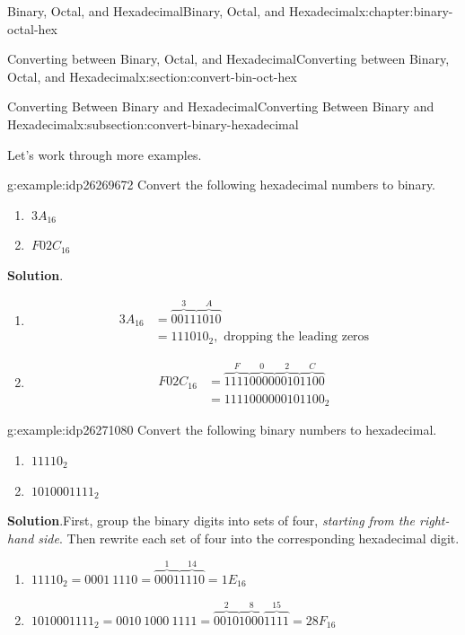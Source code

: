\documentclass[twoside,10pt,]{book}
\newcommand{\blocktitlefont}{\relax}
\numberwithin{equation}{section}
\newcommand{\amp}{&}
\begin{document}
\begin{chapterptx}{Binary, Octal, and Hexadecimal}{}{Binary, Octal, and Hexadecimal}{}{}{x:chapter:binary-octal-hex}
\begin{sectionptx}{Converting between Binary, Octal, and Hexadecimal}{}{Converting between Binary, Octal, and Hexadecimal}{}{}{x:section:convert-bin-oct-hex}
\begin{subsectionptx}{Converting Between Binary and Hexadecimal}{}{Converting Between Binary and Hexadecimal}{}{}{x:subsection:convert-binary-hexadecimal}
%
\par
Let's work through more examples.%
\begin{example}{}{g:example:idp26269672}%
Convert the following hexadecimal numbers to binary. %
%
\begin{enumerate}
\item{}\(\displaystyle \ 3A_{16}\)%
\item{}\(\displaystyle \ F02C_{16}\)%
\end{enumerate}
\par\smallskip%
\noindent\textbf{\blocktitlefont Solution}.\label{g:solution:idp26273384}{}\hypertarget{g:solution:idp26273384}{}\quad{}%
\begin{enumerate}
\item{}%
\begin{align*}
3A_{16} \amp = \overbrace{0011}^3\overbrace{1010}^A\\
\amp = 111010_2,\text{ dropping the leading zeros}
\end{align*}
%
\item{}%
\begin{align*}
F02C_{16} \amp = \overbrace{1111}^F\overbrace{0000}^0\overbrace{0010}^2\overbrace{1100}^C\\
\amp = 1111000000101100_2
\end{align*}
%
\end{enumerate}
\end{example}
\begin{example}{}{g:example:idp26271080}%
Convert the following binary numbers to hexadecimal. %
\begin{enumerate}
\item{}\(\displaystyle \ 11110_2\)%
\item{}\(\displaystyle \ 1010001111_2\)%
\end{enumerate}
\par\smallskip%
\noindent\textbf{\blocktitlefont Solution}.\label{g:solution:idp26276968}{}\hypertarget{g:solution:idp26276968}{}\quad{}First, group the binary digits into sets of four, \emph{starting from the right-hand side}.  Then rewrite each set of four into the corresponding hexadecimal digit. %
\begin{enumerate}
\item{}\(\displaystyle \ 11110_2 = 0001\ 1110 = \overbrace{0001}^1\overbrace{1110}^{14}=1E_{16}\)%
\item{}\(\displaystyle \ 1010001111_2 = 0010\ 1000\ 1111=\overbrace{0010}^2\overbrace{1000}^8\overbrace{1111}^{15}=28F_{16}\)%

\end{enumerate}
\end{example}
\end{subsectionptx}
\end{sectionptx}
\end{chapterptx}
\end{document}
